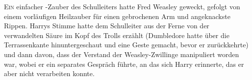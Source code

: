 
\lettrine{E}{in} einfacher -Zauber des Schulleiters hatte Fred Weasley geweckt, gefolgt von einem vorläufigen Heilzauber für einen gebrochenen Arm und angeknackste Rippen. Harrys Stimme hatte dem Schulleiter aus der Ferne von der verwandelten Säure im Kopf des Trolls erzählt (Dumbledore hatte über die Terrassenkante hinuntergeschaut und eine Geste gemacht, bevor er zurückkehrte) und dann davon, dass der Verstand der Weasley-Zwillinge manipuliert worden war, wobei er ein separates Gespräch führte, an das sich Harry erinnerte, das er aber nicht verarbeiten konnte.

